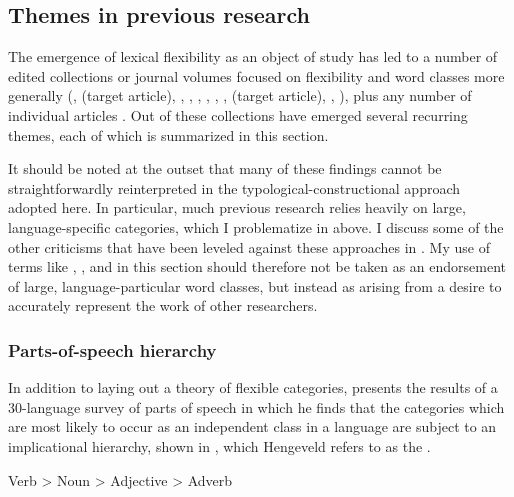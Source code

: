 \subsection{Themes in previous research}
\label{sec:2.3.2}

The emergence of lexical flexibility as an object of study has led to a number of edited collections or journal volumes focused on flexibility and word classes more generally (\cite{VogelComrie2000}, \cite{EvansOsada2005} (target article), \cite{AnsaldoDonPfau2010}, \cite{LoisVapnarsky2003}, \cite{RijkhoffLier2013}, \cite{SimoneMasini2014}, \cite{BlaszczakKlimekJankowskaMigdalski2015}, \cite{VapnarskyVeneziano2017b}, \cite{Lier2017} (target article), \cite{VapnarskyVeneziano2017a}, \cite{CuyckensHeyvaertHartmann2019}), plus any number of individual articles . Out of these collections have emerged several recurring themes, each of which is summarized in this section.

It should be noted at the outset that many of these findings cannot be straightforwardly reinterpreted in the typological-constructional approach adopted here. In particular, much previous research relies heavily on large, language-specific categories, which I problematize in  above. I discuss some of the other criticisms that have been leveled against these approaches in . My use of terms like , , and  in this section should therefore not be taken as an endorsement of large, language-particular word classes, but instead as arising from a desire to accurately represent the work of other researchers.

\subsubsection{Parts-of-speech hierarchy}
\label{sec:2.3.2.1}

In addition to laying out a theory of flexible categories, \textcite{Hengeveld1992} presents the results of a 30-language survey of parts of speech in which he finds that the categories which are most likely to occur as an independent class in a language are subject to an implicational hierarchy, shown in , which Hengeveld refers to as the .

\begin{exe}
  \ex\label{ex:2.8} Verb > Noun > Adjective > Adverb
\end{exe}


